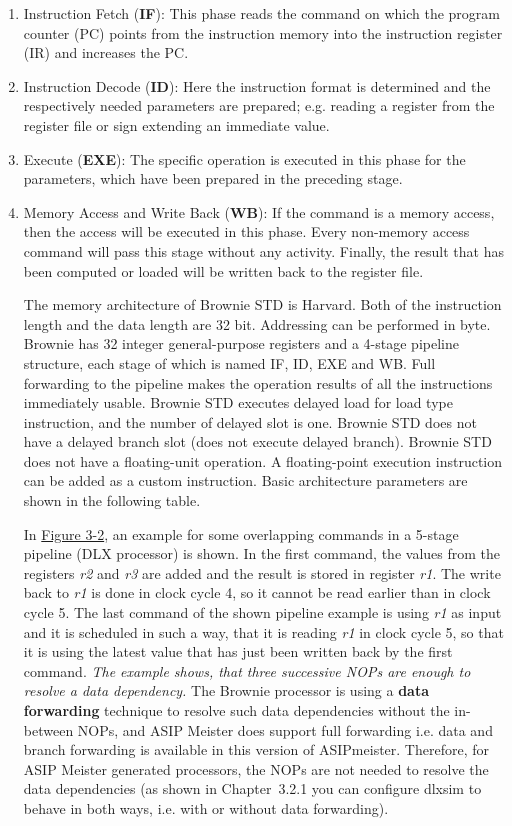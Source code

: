 \documentclass[
]{article}
\begin{document}
\begin{enumerate}
\def\labelenumi{\arabic{enumi}.}
\item
  Instruction Fetch (\textbf{IF}): This phase reads the command on which
  the program counter (PC) points from the instruction memory into the
  instruction register (IR) and increases the PC.
\item
  Instruction Decode (\textbf{ID}): Here the instruction format is
  determined and the respectively needed parameters are prepared; e.g.
  reading a register from the register file or sign extending an
  immediate value.
\item
  Execute (\textbf{EXE}): The specific operation is executed in this
  phase for the parameters, which have been prepared in the preceding
  stage.
\item
  Memory Access and Write Back (\textbf{WB}): If the command is a memory
  access, then the access will be executed in this phase. Every
  non-memory access command will pass this stage without any activity.
  Finally, the result that has been computed or loaded will be written
  back to the register file.

  The memory architecture of Brownie STD is Harvard. Both of the
  instruction length and the data length are 32 bit. Addressing can be
  performed in byte. Brownie has 32 integer general-purpose registers
  and a 4-stage pipeline structure, each stage of which is named IF, ID,
  EXE and WB. Full forwarding to the pipeline makes the operation
  results of all the instructions immediately usable. Brownie STD
  executes delayed load for load type instruction, and the number of
  delayed slot is one. Brownie STD does not have a delayed branch slot
  (does not execute delayed branch). Brownie STD does not have a
  floating-unit operation. A floating-point execution instruction can be
  added as a custom instruction. Basic architecture parameters are shown
  in the following table.

  In \protect\hyperlink{Fig32}{Figure 3-2}, an example for some
  overlapping commands in a 5-stage pipeline (DLX processor) is shown.
  In the first command, the values from the registers \emph{r2} and
  \emph{r3} are added and the result is stored in register \emph{r1}.
  The write back to \emph{r1} is done in clock cycle 4, so it cannot be
  read earlier than in clock cycle 5. The last command of the shown
  pipeline example is using \emph{r1} as input and it is scheduled in
  such a way, that it is reading \emph{r1} in clock cycle 5, so that it
  is using the latest value that has just been written back by the first
  command. \emph{The example shows, that three successive NOPs are
  enough to resolve a data dependency.} The Brownie processor is using a
  \textbf{data forwarding} technique to resolve such data dependencies
  without the in-between NOPs, and ASIP Meister does support full
  forwarding i.e. data and branch forwarding is available in this
  version of ASIPmeister. Therefore, for ASIP Meister generated
  processors, the NOPs are not needed to resolve the data dependencies
  (as shown in Chapter~3.2.1 you can configure dlxsim to behave in both
  ways, i.e. with or without data forwarding).
\end{enumerate}
\end{document}
